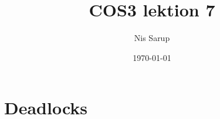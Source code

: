 \documentclass[a4wide,10pt]{article}
\begin{document}
\title{COS3 lektion 7}
\author{Nis Sarup}
\date{\today}
\maketitle


\addtocounter{section}{6}
\section{Deadlocks} %
\label{sec:deadlocks}

\end{document}

